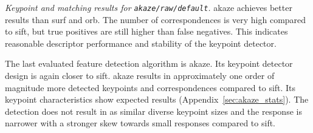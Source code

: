 \begin{table}[H]
    {\renewcommand{\arraystretch}{1.2}%
    \setlength{\tabcolsep}{0.6em}%
    \footnotesize

    }
    \caption[Keypoint and matching results for \texttt{\acrshort{akaze}/raw/default}]{\emph{Keypoint and matching results for \texttt{\acrshort{akaze}/raw/default}.} \acrshort{akaze} achieves better results than \acrshort{surf} and \acrshort{orb}. The number of correspondences is very high compared to \acrshort{sift}, but true positives are still higher than false negatives. This indicates reasonable descriptor performance and stability of the keypoint detector.}
\end{table}
The last evaluated feature detection algorithm is \acrshort{akaze}.
Its keypoint detector design is again closer to \acrshort{sift}.
\acrshort{akaze} results in approximately one order of magnitude more detected keypoints and correspondences compared to \acrshort{sift}.
Its keypoint characteristics show expected results (Appendix~\ref{sec:akaze_stats}).
The detection does not result in as similar diverse keypoint sizes and the response is narrower with a stronger skew towards small responses compared to \acrshort{sift}.
